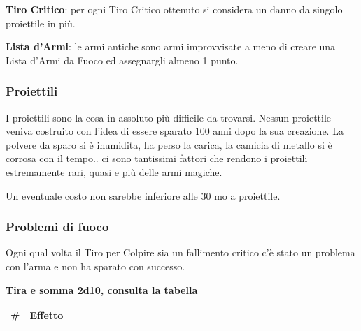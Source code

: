 \begin{multicols}{2}
\textbf{Tiro Critico}: per ogni Tiro Critico ottenuto si considera un danno da singolo proiettile in più.

\textbf{Lista d'Armi}: le armi antiche sono armi improvvisate a meno di creare una Lista d'Armi da Fuoco ed assegnargli almeno 1 punto.

\subsubsection*{Proiettili}

I proiettili sono la cosa in assoluto più difficile da trovarsi. Nessun proiettile veniva costruito con l'idea di essere sparato 100 anni dopo la sua creazione.
La polvere da sparo si è inumidita, ha perso la carica, la camicia di metallo si è corrosa con il tempo.. ci sono tantissimi fattori che rendono i proiettili estremamente rari, quasi e più delle armi magiche.

Un eventuale costo non sarebbe inferiore alle 30 mo a proiettile.

\subsubsection*{Problemi di fuoco}

Ogni qual volta il Tiro per Colpire sia un fallimento critico c'è stato un problema con l'arma e non ha sparato con successo.

\medskip

\textbf{Tira e somma 2d10, consulta la tabella}

\medskip

\noindent\begin{tabularx}{0.48\textwidth}{lX}
\toprule
\textbf{\#}& \textbf{Effetto}\\


\end{tabularx}
\end{multicols}
